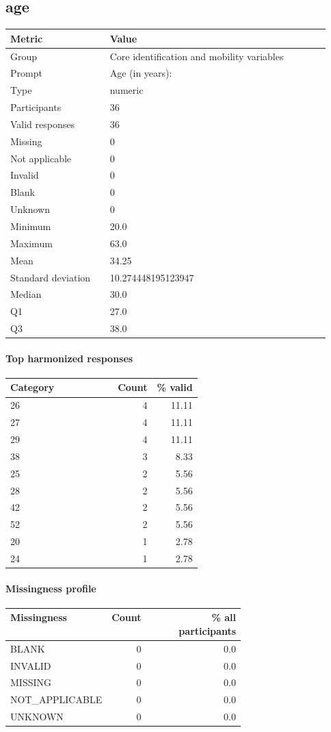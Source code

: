 \subsection*{age}
\begin{tabular}{p{0.28\linewidth}p{0.62\linewidth}}
\toprule
Metric & Value\\
\midrule
Group & Core identification and mobility variables\\
Prompt & Age (in years):\\
Type & numeric\\
Participants & 36\\
Valid responses & 36\\
Missing & 0\\
Not applicable & 0\\
Invalid & 0\\
Blank & 0\\
Unknown & 0\\
Minimum & 20.0\\
Maximum & 63.0\\
Mean & 34.25\\
Standard deviation & 10.274448195123947\\
Median & 30.0\\
Q1 & 27.0\\
Q3 & 38.0\\
\bottomrule
\end{tabular}

\paragraph{Top harmonized responses}
\begin{tabular}{p{0.56\linewidth}rr}
\toprule
Category & Count & \% valid\\
\midrule
26 & 4 & 11.11\\
27 & 4 & 11.11\\
29 & 4 & 11.11\\
38 & 3 & 8.33\\
25 & 2 & 5.56\\
28 & 2 & 5.56\\
42 & 2 & 5.56\\
52 & 2 & 5.56\\
20 & 1 & 2.78\\
24 & 1 & 2.78\\
\bottomrule
\end{tabular}

\paragraph{Missingness profile}
\begin{tabular}{p{0.40\linewidth}rr}
\toprule
Missingness & Count & \% all participants\\
\midrule
BLANK & 0 & 0.0\\
INVALID & 0 & 0.0\\
MISSING & 0 & 0.0\\
NOT\_APPLICABLE & 0 & 0.0\\
UNKNOWN & 0 & 0.0\\
\bottomrule
\end{tabular}

